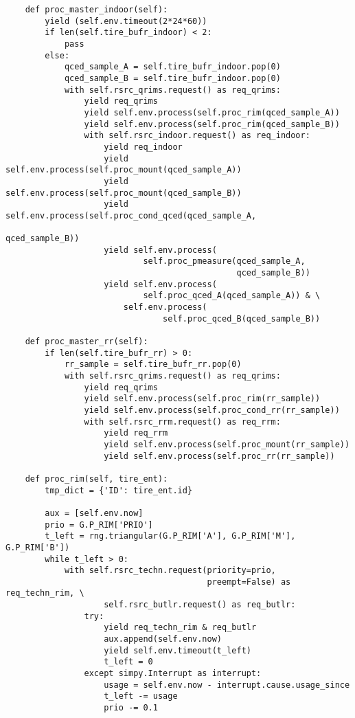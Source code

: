\begin{verbatim}
    def proc_master_indoor(self):
        yield (self.env.timeout(2*24*60))
        if len(self.tire_bufr_indoor) < 2:
            pass
        else:
            qced_sample_A = self.tire_bufr_indoor.pop(0)
            qced_sample_B = self.tire_bufr_indoor.pop(0)
            with self.rsrc_qrims.request() as req_qrims:
                yield req_qrims
                yield self.env.process(self.proc_rim(qced_sample_A))
                yield self.env.process(self.proc_rim(qced_sample_B))
                with self.rsrc_indoor.request() as req_indoor:
                    yield req_indoor
                    yield self.env.process(self.proc_mount(qced_sample_A))
                    yield self.env.process(self.proc_mount(qced_sample_B))
                    yield self.env.process(self.proc_cond_qced(qced_sample_A,
                                                               qced_sample_B))
                    yield self.env.process(
                            self.proc_pmeasure(qced_sample_A,
                                               qced_sample_B))
                    yield self.env.process(
                            self.proc_qced_A(qced_sample_A)) & \
                        self.env.process(
                                self.proc_qced_B(qced_sample_B))

    def proc_master_rr(self):
        if len(self.tire_bufr_rr) > 0:
            rr_sample = self.tire_bufr_rr.pop(0)
            with self.rsrc_qrims.request() as req_qrims:
                yield req_qrims
                yield self.env.process(self.proc_rim(rr_sample))
                yield self.env.process(self.proc_cond_rr(rr_sample))
                with self.rsrc_rrm.request() as req_rrm:
                    yield req_rrm
                    yield self.env.process(self.proc_mount(rr_sample))
                    yield self.env.process(self.proc_rr(rr_sample))

    def proc_rim(self, tire_ent):
        tmp_dict = {'ID': tire_ent.id}

        aux = [self.env.now]
        prio = G.P_RIM['PRIO']
        t_left = rng.triangular(G.P_RIM['A'], G.P_RIM['M'], G.P_RIM['B'])
        while t_left > 0:
            with self.rsrc_techn.request(priority=prio,
                                         preempt=False) as req_techn_rim, \
                    self.rsrc_butlr.request() as req_butlr:
                try:
                    yield req_techn_rim & req_butlr
                    aux.append(self.env.now)
                    yield self.env.timeout(t_left)
                    t_left = 0
                except simpy.Interrupt as interrupt:
                    usage = self.env.now - interrupt.cause.usage_since
                    t_left -= usage
                    prio -= 0.1


\end{verbatim}
